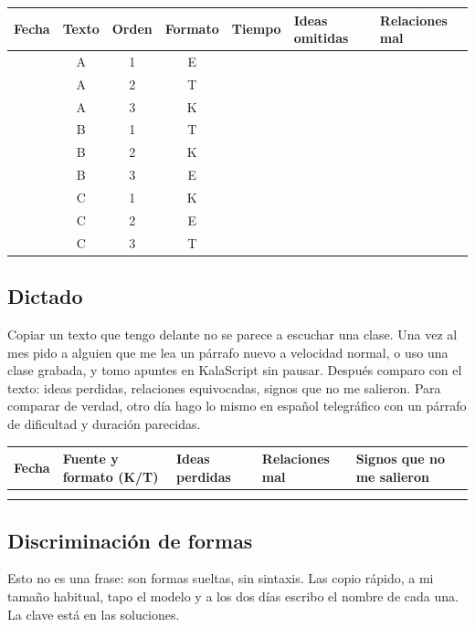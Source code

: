 \documentclass[11pt,a4paper]{article}
\begin{document}
\begin{center}\small
\begin{tabular}{@{}lccccp{24mm}p{24mm}@{}}
\toprule Fecha & Texto & Orden & Formato & Tiempo & Ideas omitidas & Relaciones mal \\ \midrule
& A & 1 & E & & & \\ \hline
& A & 2 & T & & & \\ \hline
& A & 3 & K & & & \\ \hline
& B & 1 & T & & & \\ \hline
& B & 2 & K & & & \\ \hline
& B & 3 & E & & & \\ \hline
& C & 1 & K & & & \\ \hline
& C & 2 & E & & & \\ \hline
& C & 3 & T & & & \\ \bottomrule
\end{tabular}
\end{center}

\subsection*{Dictado}
Copiar un texto que tengo delante no se parece a escuchar una clase. Una vez al
mes pido a alguien que me lea un párrafo nuevo a velocidad normal, o uso una
clase grabada, y tomo apuntes en KalaScript sin pausar. Después comparo con el
texto: ideas perdidas, relaciones equivocadas, signos que no me salieron. Para
comparar de verdad, otro día hago lo mismo en español telegráfico con un
párrafo de dificultad y duración parecidas.
\begin{center}\small
\begin{tabular}{@{}lp{30mm}p{22mm}p{22mm}p{40mm}@{}}
\toprule Fecha & Fuente y formato (K/T) & Ideas perdidas & Relaciones mal & Signos que no me salieron \\ \midrule
\rule{0pt}{8mm} & & & & \\ \hline
\rule{0pt}{8mm} & & & & \\ \bottomrule
\end{tabular}
\end{center}

\subsection*{Discriminación de formas}
Esto no es una frase: son formas sueltas, sin sintaxis. Las copio rápido, a mi
tamaño habitual, tapo el modelo y a los dos días escribo el nombre de cada una.
La clave está en las soluciones.
\begin{center}
\quad{}\quad{}\quad{}\quad{}\quad{}\quad{}\quad{}\quad{}\quad{}\quad{}\quad{}\quad{}\quad{}\quad{}
\end{center}
\end{document}
